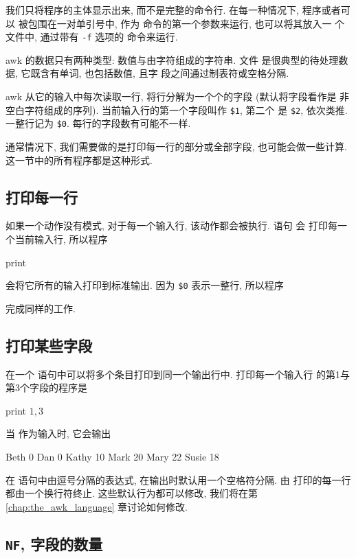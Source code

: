 我们只将程序的主体显示出来, 而不是完整的命令行. 在每一种情况下, 程序或者可以
被包围在一对单引号中, 作为 \awk 命令的第一个参数来运行, 也可以将其放入一
个文件中, 通过带有 \verb'-f' 选项的 \awk 命令来运行.

 awk 的数据只有两种类型: 数值与由字符组成的字符串. 文件
 是很典型的待处理数据, 它既含有单词, 也包括数值, 且字
段之间通过制表符或空格分隔.

awk 从它的输入中每次读取一行, 将行分解为一个个的字段 (默认将字段看作是
非空白字符组成的序列). 当前输入行的第一个字段叫作 \verb'$1', 第二个
是 \verb'$2', 依次类推. 一整行记为 \verb'$0'. 每行的字段数有可能不一样.

通常情况下, 我们需要做的是打印每一行的部分或全部字段, 也可能会做一些计算.
这一节中的所有程序都是这种形式.

\subsection{打印每一行}
\label{subsec:printing_every_line}

如果一个动作没有模式, 对于每一个输入行, 该动作都会被执行. 语句 \print 会
打印每一个当前输入行, 所以程序
\begin{awkcode}
    { print }
\end{awkcode}
会将它所有的输入打印到标准输出. 因为 \verb'$0' 表示一整行, 所以程序
完成同样的工作.

\subsection{打印某些字段}
\label{subsec:printing_certain_fields}

在一个 \print 语句中可以将多个条目打印到同一个输出行中. 打印每一个输入行
的第1与第3个字段的程序是
\begin{awkcode}
    { print $1, $3 }
\end{awkcode}
当  作为输入时, 它会输出
\begin{awkcode}
    Beth 0
    Dan 0
    Kathy 10
    Mark 20
    Mary 22
    Susie 18
\end{awkcode}
在 \print 语句中由逗号分隔的表达式, 在输出时默认用一个空格符分隔. 由
\print 打印的每一行都由一个换行符终止. 这些默认行为都可以修改, 我们将在第
\ref{chap:the_awk_language} 章讨论如何修改.

\subsection{\texttt{NF}, 字段的数量}
\label{subsec:nf_the_number_fields}

